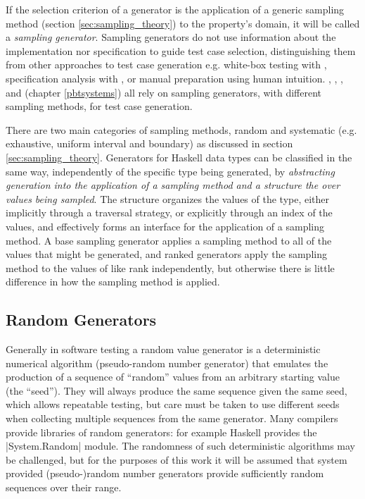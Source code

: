 
If the selection criterion of a generator is
the application of a generic sampling method (section \ref{sec:sampling_theory})
to the property's domain,
it will be called a \emph{sampling generator}.
Sampling generators do not use information about 
the implementation nor specification to guide test case selection,
distinguishing them from other approaches to test case generation
e.g. white-box testing with \DAISTS, 
specification analysis with \HOLTG, 
or manual preparation using human intuition.
\QC, \SC, \GAST, \EC and \FEAT (chapter \ref{pbtsystems})
all rely on sampling generators,
with different sampling methods,
for test case generation.

There are two main categories of sampling methods,
random and systematic (e.g. exhaustive, uniform interval and boundary)
as discussed in section \ref{sec:sampling_theory}.
Generators for Haskell data types can be classified in the same way,
independently of the specific type being generated,
by \emph{abstracting generation into the application of a sampling method
and a structure the over values being sampled}.
The structure organizes the values of the type,
either implicitly through a traversal strategy,
or explicitly through an index of the values,
and effectively forms an interface for the application of a sampling method.
A base sampling generator applies a sampling method to all of the values that might be generated,
and ranked generators apply the sampling method to the values of like rank independently,
but otherwise there is little difference in how the sampling method is applied.


\subsection{Random Generators}

Generally in software testing  a random value generator 
is a deterministic numerical algorithm (pseudo-random number generator) that 
emulates the production of a sequence of ``random'' values
from an arbitrary starting value (the ``seed'').
They will always produce the same sequence given the same seed,
which allows repeatable testing,
but care must be taken to use different seeds
when collecting multiple sequences from the same generator.
Many compilers provide libraries of random generators:
for example Haskell provides the |System.Random| module.
The randomness of such deterministic algorithms may be challenged,
but for the purposes of this work it will be assumed that system provided
(pseudo-)random number generators provide 
sufficiently random sequences over their range.

